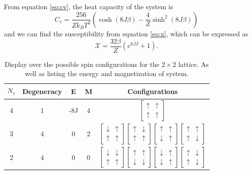\documentclass[%
reprint,
nofootinbib,
amsmath,amssymb,
aps,
]{revtex4-1}
\begin{document}
From equation \eqref{eq:cv}, the heat capacity of the system is 
\begin{equation}
	C_v = \frac{256}{Zk_BT^2}\left( \cosh(8J\beta) - \frac{4}{Z}\sinh^2(8J\beta)\right)
\end{equation}
and we can find the susceptibility from equation \eqref{eq:x}, which can be expressed as 
\begin{equation}
	\mathcal{X} = \frac{32\beta}{Z}\left(e^{8J\beta} +1\right).
\end{equation}
\begin{table}
	\vspace{10pt}
	\caption{Display over the possible spin configurations for the $2\times 2$ lattice. As well as listing the energy and magnetization of system.}
	\label{tab:2x2}
\begin{tabular}{|c|c|c|c|c|}
	\hline 
	$N_\uparrow$ & Degeneracy & E  & M & Configurations\\
	\hline
	4 & 1 & -8J & 4 & $\begin{bmatrix}\uparrow & \uparrow \\ \uparrow&\uparrow\end{bmatrix}$\\
	3 & 4 & 0 & 2 & $\begin{bmatrix}\downarrow & \uparrow \\ \uparrow&\uparrow\end{bmatrix}\begin{bmatrix}\uparrow & \downarrow \\ \uparrow&\uparrow\end{bmatrix}\begin{bmatrix}\uparrow & \uparrow \\ \downarrow&\uparrow\end{bmatrix}\begin{bmatrix}\uparrow & \uparrow \\ \uparrow&\downarrow\end{bmatrix}$\\
	2 & 4 & 0 & 0 &$\begin{bmatrix}\downarrow & \downarrow \\ \uparrow&\uparrow\end{bmatrix}\begin{bmatrix}\uparrow & \uparrow \\ \downarrow&\downarrow\end{bmatrix}\begin{bmatrix}\downarrow & \uparrow \\ \downarrow&\uparrow\end{bmatrix}\begin{bmatrix}\uparrow & \downarrow \\ \uparrow&\downarrow\end{bmatrix}$\\

\end{tabular}
\end{table}
\end{document}
